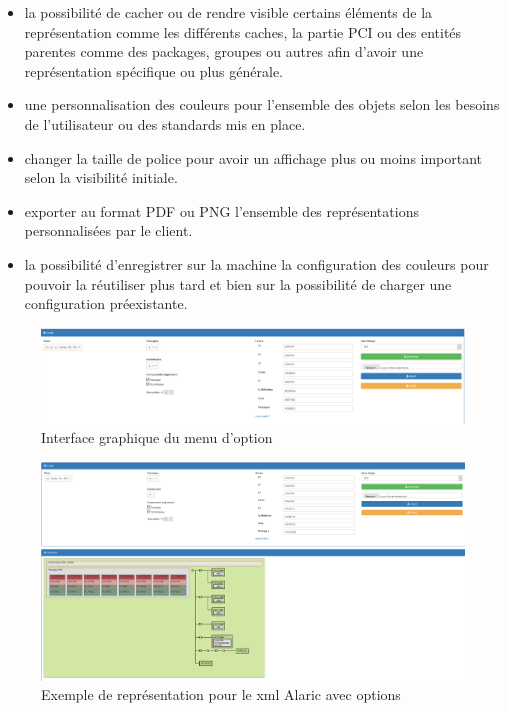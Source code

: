 \documentclass [a4paper,11pt]{article}
\begin{document}
\begin{itemize}
\item la possibilité de cacher ou de rendre visible certains éléments de la représentation comme les différents caches, la partie PCI ou des entités parentes comme des packages, groupes ou autres afin d'avoir une représentation spécifique ou plus générale.
\item une personnalisation des couleurs pour l'ensemble des objets selon les besoins de l'utilisateur ou des standards mis en place.
\item changer la taille de police pour avoir un affichage plus ou moins important selon la visibilité initiale. 
\item exporter au format PDF ou PNG l'ensemble des représentations personnalisées par le client.
\item la possibilité d'enregistrer sur la machine la configuration des couleurs pour pouvoir la réutiliser plus tard et bien sur la possibilité de charger une configuration préexistante.
\end{itemize}

\begin{figure}[H]
\centering
\includegraphics[scale=0.3]{img/filtre.png}
\caption{Interface graphique du menu d'option}
\end{figure}

\begin{figure}[H]
\centering
\includegraphics[scale=0.3]{img/alaric_modif.png}
\caption{Exemple de représentation pour le xml Alaric avec options}
\end{figure}
\end{document}
